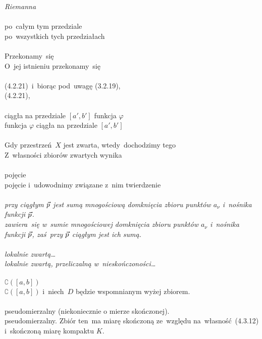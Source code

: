 \documentclass[a4paper,11pt]{article}
\numberwithin{equation}{section}
\begin{document}
\Powin \textit{Riemanna} \\
 \\
\Jest  po~całym tym przedziale \\
\Powin po~wszystkich tych przedziałach \\
 \\
\Jest Przekonamy~się \\
\Powin  O~jej istnieniu przekonamy~się \\
 \\
\Jest  (4.2.21)~i~biorąc pod~uwagę (3.2.19), \\
\Powin (4.2.21), \\
 \\
\Jest  ciągła na przedziale $[ a', b' ]$ funkcja $\varphi$ \\
\Powin funkcja $\varphi$ ciągła na przedziale $[ a', b' ]$ \\
 \\
\Jest  Gdy przestrzeń~$X$ jest zwarta, wtedy~dochodzimy tego \\
\Powin Z~własności zbiorów zwartych wynika \\
 \\
\Jest  pojęcie \\
\Powin pojęcie i~udowodnimy związane z~nim twierdzenie \\
 \\
\Jest  \textit{przy ciągłym $\vec{p}$ jest sumą mnogościową domknięcia
  zbioru punktów $a_{ \nu }$ i~nośnika
  funkcji $\vec{p}$.} \\
\Powin \textit{zawiera~się w~sumie mnogościowej domknięcia zbioru
  punktów $a_{ \nu }$ i~nośnika funkcji $\vec{p}$, zaś~przy
  $\vec{p}$ ciągłym jest ich sumą.} \\
 \\
\Jest  \textit{lokalnie zwartą\ldots} \\
\Powin \textit{lokalnie zwartą, przeliczalną w~nieskończoności\ldots} \\
 \\
\Jest  $\complement ( [ a, b ] )$ \\
\Powin $\complement ( [ a, b ] )$ i~niech~$D$ będzie wspomnianym wyżej
zbiorem. \\
 \\
\Jest  pseudomierzalny (niekoniecznie o mierze skończonej). \\
\Powin pseudomierzalny. Zbiór ten~ma miarę skończoną ze~względu
na~własność~(4.3.12) i~skończoną miarę kompaktu $K$. \\
\end{document}
